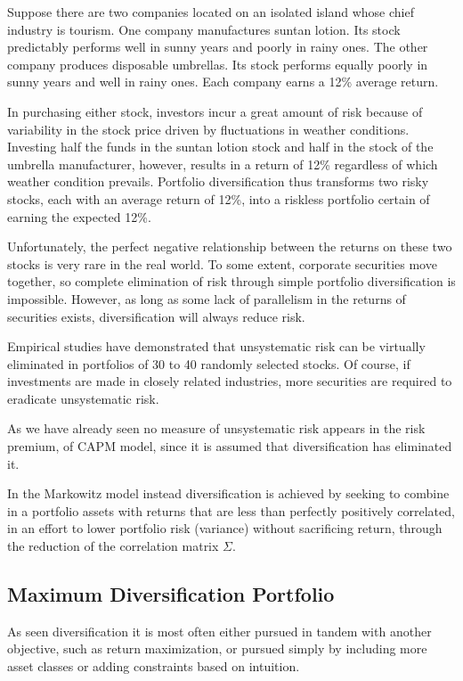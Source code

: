 Suppose there are two companies located on an isolated island whose chief industry is tourism. One company manufactures suntan lotion. Its stock predictably performs well in sunny years and poorly in rainy ones. The other company produces disposable umbrellas. Its stock performs equally poorly in sunny years and well in rainy ones. Each company earns a 12\% average return.

In purchasing either stock, investors incur a great amount of risk because of variability in the stock price driven by fluctuations in weather conditions. Investing half the funds in the suntan lotion stock and half in the stock of the umbrella manufacturer, however, results in a return of 12\% regardless of which weather condition prevails. Portfolio diversification thus transforms two risky stocks, each with an average return of 12\%, into a riskless portfolio certain of earning the expected 12\%.

Unfortunately, the perfect negative relationship between the returns on these two stocks is very rare in the real world. To some extent, corporate securities move together, so complete elimination of risk through simple portfolio diversification is impossible. However, as long as some lack of parallelism in the returns of securities exists, diversification will always reduce risk.

Empirical studies have demonstrated that unsystematic risk can be virtually eliminated in portfolios of 30 to 40 randomly selected stocks. Of course, if investments are made in closely related industries, more securities are required to eradicate unsystematic risk.

As we have already seen no measure of unsystematic risk appears in the risk premium, of CAPM model, since it is assumed that diversification has eliminated it.

In the Markowitz model instead diversification is achieved by seeking to combine in a portfolio assets with returns that are less than perfectly positively correlated, in an effort to lower portfolio risk (variance) without sacrificing return, through the reduction of the correlation matrix $\Sigma$.

\subsection{Maximum Diversification Portfolio}
\label{maximum-diversification-portfolio}

As seen diversification it is most often either pursued in tandem with another objective, such as return maximization, or pursued simply by including more asset classes or adding constraints based on intuition.

